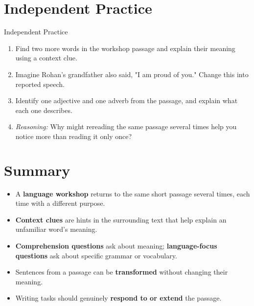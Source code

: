 \section{Independent Practice}
\begin{activitybox}{Independent Practice}
\begin{enumerate}
    \item Find two more words in the workshop passage and explain their meaning using a context clue.
    \item Imagine Rohan's grandfather also said, "I am proud of you." Change this into reported speech.
    \item Identify one adjective and one adverb from the passage, and explain what each one describes.
    \item \textit{Reasoning:} Why might rereading the same passage several times help you notice more than reading it only once?
\end{enumerate}
\end{activitybox}

\section{Summary}
\begin{summarybox}
\begin{itemize}
    \item A \textbf{language workshop} returns to the same short passage several times, each time with a different purpose.
    \item \textbf{Context clues} are hints in the surrounding text that help explain an unfamiliar word's meaning.
    \item \textbf{Comprehension questions} ask about meaning; \textbf{language-focus questions} ask about specific grammar or vocabulary.
    \item Sentences from a passage can be \textbf{transformed} without changing their meaning.
    \item Writing tasks should genuinely \textbf{respond to or extend} the passage.
\end{itemize}
\end{summarybox}

